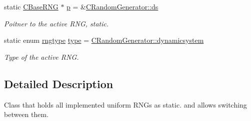 \begin{DoxyCompactItemize}
static \hyperlink{class_c_base_r_n_g}{C\-Base\-R\-N\-G} $\ast$ \hyperlink{class_c_random_generator_acbfaff7d68bd7dd1e5e2887f6052c7b1}{p} = \&\hyperlink{class_c_random_generator_aaf505f11f33ef8a796792f159ff1000d}{C\-Random\-Generator\-::ds}
\begin{DoxyCompactList}\small\item\em Poitner to the active R\-N\-G, static. \end{DoxyCompactList}\item 
static enum \hyperlink{class_c_random_generator_a50566d64b5ada7e335fc3acd52d958f6}{rngtype} \hyperlink{class_c_random_generator_ad7cabc0ed9cdca955d2c6db269531354}{type} = \hyperlink{class_c_random_generator_a50566d64b5ada7e335fc3acd52d958f6a2915c3490d8305158735b8b279f24cd6}{C\-Random\-Generator\-::dynamicsystem}
\begin{DoxyCompactList}\small\item\em Type of the active R\-N\-G. \end{DoxyCompactList}\end{DoxyCompactItemize}


\subsection{Detailed Description}
Class that holds all implemented uniform R\-N\-Gs as static. and allows switching between them. 

